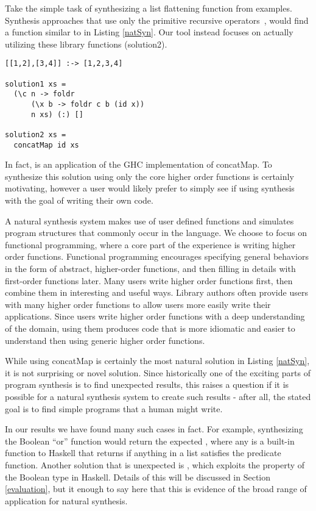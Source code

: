 Take the simple task of synthesizing a list flattening function from examples. 
Synthesis approaches that use only the primitive recursive operators~\cite{Osera:2015,FeserCD15}, would find a function similar to  in Listing \ref{natSyn}.
Our tool instead focuses on actually utilizing these library functions (solution2).

\begin{lstlisting}[caption=Low-level synthesis vs. Natural synthesis,label=natSyn]
[[1,2],[3,4]] :-> [1,2,3,4]

solution1 xs = 
  (\c n -> foldr 
      (\x b -> foldr c b (id x))
      n xs) (:) []
      
solution2 xs =
  concatMap id xs
\end{lstlisting}

\noindent In fact,  is an application of the GHC\cite{ghc} implementation of concatMap. To synthesize this solution using only the core higher order functions is certainly motivating, however a user would likely prefer to simply see  if using synthesis with the goal of writing their own code.

A natural synthesis system makes use of user defined functions and simulates program structures that commonly occur in the language.  
We choose to focus on functional programming, where a core part of the experience is writing higher order functions.  
Functional programming encourages specifying general behaviors in the form of abstract, higher-order functions, and then filling in details with first-order functions later.
Many users write higher order functions first, then combine them in interesting and useful ways.
Library authors often provide users with many higher order functions to allow users more easily write their applications.
Since users write higher order functions with a deep understanding of the domain, using them produces code that is more idiomatic and easier to understand then using generic higher order functions.

While using concatMap is certainly the most natural solution in Listing \ref{natSyn}, it is not surprising or novel solution. 
Since historically one of the exciting parts of program synthesis is to find unexpected results, this raises a question if it is possible for a natural synthesis system to create such results - after all, the stated goal is to find simple programs that a human might write.

In our results we have found many such cases in fact. 
For example, synthesizing the Boolean ``or'' function would return the expected , where any is a built-in function to Haskell that returns  if anything in a list satisfies the predicate function. 
Another solution that is unexpected is , which exploits the  property of the Boolean type in Haskell. 
Details of this will be discussed in Section \ref{evaluation}, but it enough to say here that this is evidence of the broad range of application for natural synthesis.

